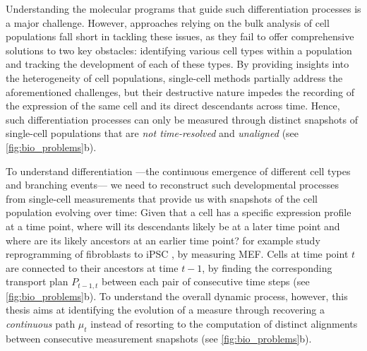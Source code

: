 Understanding the molecular programs that guide such differentiation processes is a major challenge.
However, approaches relying on the bulk analysis of cell populations fall short in tackling these issues, as they fail to offer comprehensive solutions to two key obstacles: identifying various cell types within a population and tracking the development of each of these types.
By providing insights into the heterogeneity of cell populations, single-cell methods partially address the aforementioned challenges, but their destructive nature impedes the recording of the expression of the same cell and its direct descendants across time.
Hence, such differentiation processes can only be measured through distinct snapshots of single-cell populations that are \textit{not time-resolved} and \textit{unaligned} (see \cref{fig:bio_problems}b).

To understand differentiation ---the continuous emergence of different cell types and branching events--- we need to reconstruct such developmental processes from single-cell measurements that provide us with snapshots of the cell population evolving over time:
Given that a cell has a specific expression profile at a time point, where will its descendants likely be at a later time point and where are its likely ancestors at an earlier time point? 
\citet{schiebinger2019optimal} for example study reprogramming of fibroblasts to \acrfull{iPSC} \citep{takahashi2006induction}, by measuring \acrfull{MEF}. Cells at time point $t$ are connected to their ancestors at time $t-1$, by finding the corresponding transport plan $P_{t-1,t}$ between each pair of consecutive time steps (see \cref{fig:bio_problems}b).
To understand the overall dynamic process, however, this thesis aims at identifying the evolution of a measure through recovering a \emph{continuous} path $\mu_t$ instead of resorting to the computation of distinct alignments between consecutive measurement snapshots \citep{lavenant2021towards} (see \cref{fig:bio_problems}b).

